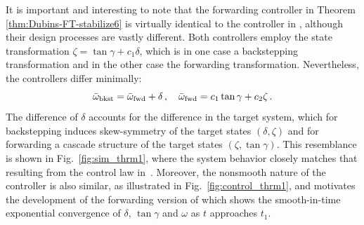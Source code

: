\documentclass[letterpaper, 10 pt, conference]{ieeeconf}  %
\begin{document}
It is important and interesting to note that the forwarding controller in Theorem \ref{thm:Dubins-FT-stabilize6} is virtually identical to the controller in \cite[Thm.~1]{Krstic2025_Dubins}, although their design processes are vastly different. Both controllers employ the state transformation $\zeta=\tan\gamma + c_1\delta$, which is in one case a backstepping transformation and in the other case the forwarding transformation. Nevertheless, the controllers differ minimally:
\begin{equation}
\bar\omega_{\rm bkst} = \bar\omega_{\rm fwd} +\delta \,, \quad \bar\omega_{\rm fwd} = c_1\tan\gamma+c_2\zeta\,.
\end{equation}
The difference of $\delta$ accounts for the difference in the target system, which for backstepping induces skew-symmetry of the target states $(\delta,\zeta)$ and for forwarding a cascade structure of the target states $(\zeta,\tan\gamma)$. This resemblance is shown in Fig.~\ref{fig:sim_thrm1}, where the system behavior closely matches that resulting from the control law in~\cite[Thm.~1]{Krstic2025_Dubins}. Moreover, the nonsmooth nature of the controller is also similar, as illustrated in Fig.~\ref{fig:control_thrm1}, and motivates the development of the forwarding version of \cite[Thm.~2]{Krstic2025_Dubins} which shows the smooth-in-time exponential convergence of $\delta$, $\tan\gamma$ and  $\omega$ as $t$ approaches $t_1$.
\end{document}

